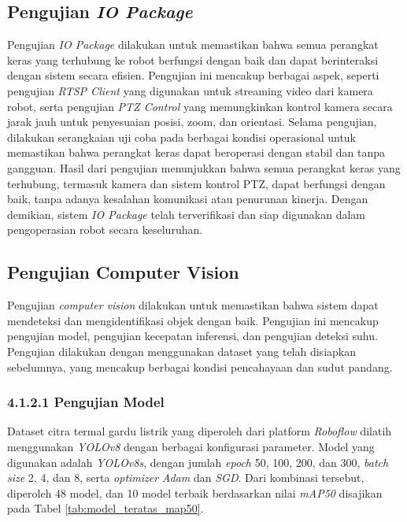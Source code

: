   \subsection{Pengujian \emph{IO Package}}
  Pengujian \emph{IO Package} dilakukan untuk memastikan bahwa semua perangkat keras yang terhubung ke robot berfungsi dengan baik dan dapat berinteraksi dengan sistem secara efisien. Pengujian ini mencakup berbagai aspek, seperti pengujian \emph{RTSP Client} yang digunakan untuk streaming video dari kamera robot, serta pengujian \emph{PTZ Control} yang memungkinkan kontrol kamera secara jarak jauh untuk penyesuaian posisi, zoom, dan orientasi. Selama pengujian, dilakukan serangkaian uji coba pada berbagai kondisi operasional untuk memastikan bahwa perangkat keras dapat beroperasi dengan stabil dan tanpa gangguan. Hasil dari pengujian menunjukkan bahwa semua perangkat keras yang terhubung, termasuk kamera dan sistem kontrol PTZ, dapat berfungsi dengan baik, tanpa adanya kesalahan komunikasi atau penurunan kinerja. Dengan demikian, sistem \emph{IO Package} telah terverifikasi dan siap digunakan dalam pengoperasian robot secara keseluruhan.
  

\subsection{Pengujian Computer Vision}
Pengujian \emph{computer vision} dilakukan untuk memastikan bahwa sistem dapat mendeteksi dan mengidentifikasi objek dengan baik. Pengujian ini mencakup pengujian model, pengujian kecepatan inferensi, dan pengujian deteksi suhu. Pengujian dilakukan dengan menggunakan dataset yang telah disiapkan sebelumnya, yang mencakup berbagai kondisi pencahayaan dan sudut pandang.

\subsubsection{4.1.2.1 Pengujian Model}
Dataset citra termal gardu listrik yang diperoleh dari platform \emph{Roboflow} dilatih menggunakan \emph{YOLOv8} dengan berbagai konfigurasi parameter. Model yang digunakan adalah \emph{YOLOv8s}, dengan jumlah \emph{epoch} 50, 100, 200, dan 300, \emph{batch size} 2, 4, dan 8, serta \emph{optimizer} \emph{Adam} dan \emph{SGD}. Dari kombinasi tersebut, diperoleh 48 model, dan 10 model terbaik berdasarkan nilai \emph{mAP50} disajikan pada Tabel \ref{tab:model_teratas_map50}.

